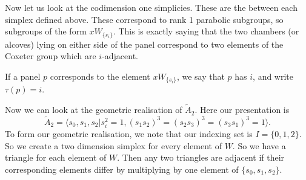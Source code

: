 \documentclass[11pt]{article}
\begin{document}
Now let us look at the codimension one simplicies. These are the  between each simplex defined above. These correspond to rank 1 parabolic subgroups, so subgroups of the form $xW_{\{s_i\}}$. This is exactly saying that the two chambers (or alcoves) lying on either side of the panel correspond to two elements of the Coxeter group which are $i$-adjacent. 








\begin{definition}
    If a panel $p$ corresponds to the element $xW_{\{s_i\}}$, we say that $p$ has  $i$, and write $\tau(p)=i$. 
\end{definition}




Now we can look at the geometric realisation of $\tilde{A}_2$. Here our presentation is
 \[\tilde{A}_2=\langle s_0,s_1,s_2|s_i^2=1, (s_1s_2)^3=(s_2s_3)^3=(s_3s_1)^3=1\rangle.\]
To form our geometric realisation, we note that our indexing set is $I=\{0,1,2\}$. So we create a two dimension simplex for every element of $W$. So we have a triangle for each element of $W$. Then any two triangles are adjacent if their corresponding elements differ by multiplying by one element of $\{s_0,s_1,s_2\}$. 
\end{document}
